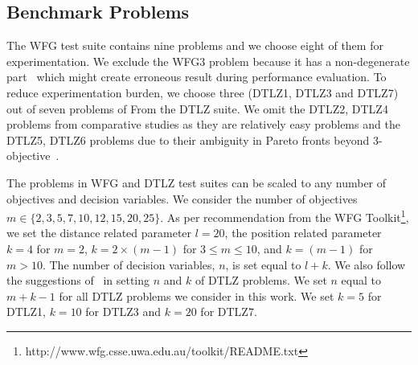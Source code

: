 \documentclass[review]{elsarticle}
\begin{document}
\subsection{Benchmark Problems}
\label{subsec:testproblems}
The WFG test suite contains nine problems and we choose eight of them for experimentation. We exclude the WFG3 problem because it has a non-degenerate part~\citep{wfgdegenrate} which might create erroneous result during performance evaluation.
To reduce experimentation burden, we choose three  (DTLZ1, DTLZ3 and DTLZ7) out of seven problems of From the DTLZ suite. We  omit
the DTLZ2, DTLZ4 problems from comparative studies as they are relatively easy problems and the DTLZ5, DTLZ6 problems due to their ambiguity in Pareto fronts beyond 3-objective~\citep{huband2006review}.

The problems in WFG and DTLZ test suites can be scaled to any number of objectives and decision variables. We consider the number of objectives $m\in\{2, 3, 5, 7, 10, 12, 15, 20, 25\}$. As per recommendation from the WFG Toolkit\footnote{http://www.wfg.csse.uwa.edu.au/toolkit/README.txt}, we set the distance related parameter $l = 20$, the position related parameter $k = 4$  for $m=2$, $k = 2 \times (m-1)$ for  $3 \leq m \leq 10$, and $k = (m-1)$ for  $m >10$.  The number of decision variables, $n$, is set equal to $l + k$. We also follow the suggestions of~\citep{deb2005scalable,deb2014evolutionary} in setting $n$ and $k$ of DTLZ problems. We set $n$ equal to $m + k - 1$ for all DTLZ problems we consider in this work. We set $k = 5$ for DTLZ1, $k = 10$ for DTLZ3 and $k = 20$ for DTLZ7. %
\end{document}

